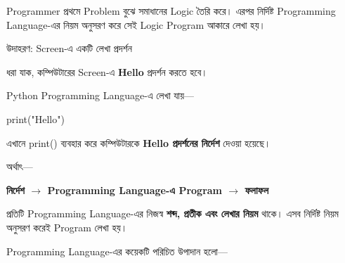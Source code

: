 Programmer প্রথমে Problem বুঝে সমাধানের Logic তৈরি করে।
এরপর নির্দিষ্ট Programming Language-এর নিয়ম অনুসরণ করে সেই
Logic Program আকারে লেখা হয়।

\begin{examplebox}{উদাহরণ: Screen-এ একটি লেখা প্রদর্শন}

ধরা যাক, কম্পিউটারের Screen-এ \textbf{Hello} প্রদর্শন করতে হবে।

Python Programming Language-এ লেখা যায়—

\begin{center}

{\textenglish{\ttfamily print("Hello")}}

\end{center}

এখানে \textenglish{\ttfamily print()} ব্যবহার করে কম্পিউটারকে
\textbf{Hello প্রদর্শনের নির্দেশ} দেওয়া হয়েছে।

অর্থাৎ—

\begin{center}

\textbf{
নির্দেশ
\(\rightarrow\)
Programming Language-এ Program
\(\rightarrow\)
ফলাফল
}

\end{center}

\end{examplebox}


প্রতিটি Programming Language-এর নিজস্ব \textbf{শব্দ, প্রতীক এবং
লেখার নিয়ম} থাকে। এসব নির্দিষ্ট নিয়ম অনুসরণ করেই Program লেখা হয়।

Programming Language-এর কয়েকটি পরিচিত উপাদান হলো—

